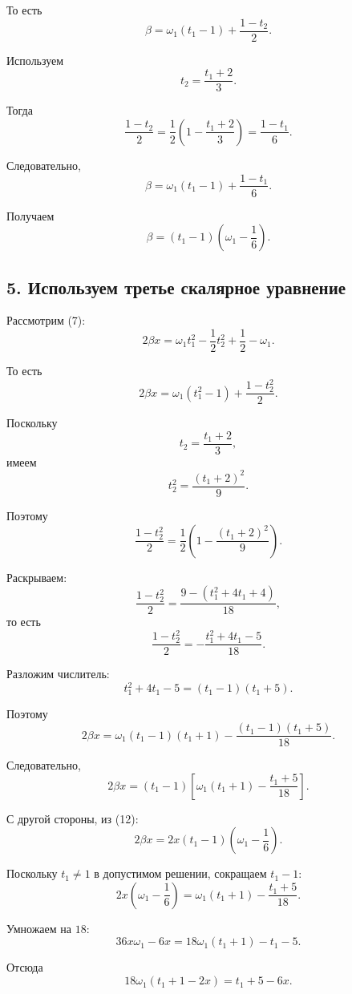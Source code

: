 \documentclass[12pt,a4paper]{article}
\begin{document}
		То есть
		\[
		\beta
		=
		\omega_1(t_1-1)+\frac{1-t_2}{2}.
		\tag{11}
		\]
		
		Используем
		\[
		t_2=\frac{t_1+2}{3}.
		\]
		
		Тогда
		\[
		\frac{1-t_2}{2}
		=
		\frac12
		\left(
		1-\frac{t_1+2}{3}
		\right)
		=
		\frac{1-t_1}{6}.
		\]
		
		Следовательно,
		\[
		\beta
		=
		\omega_1(t_1-1)+\frac{1-t_1}{6}.
		\]
		
		Получаем
		\[
		\boxed{
			\beta=(t_1-1)
			\left(
			\omega_1-\frac16
			\right)
		}.
		\tag{12}
		\]
		
		\subsection*{5. Используем третье скалярное уравнение}
		
		Рассмотрим (7):
		\[
		2\beta x
		=
		\omega_1t_1^2
		-\frac12t_2^2
		+\frac12-\omega_1.
		\]
		
		То есть
		\[
		2\beta x
		=
		\omega_1(t_1^2-1)
		+\frac{1-t_2^2}{2}.
		\tag{13}
		\]
		
		Поскольку
		\[
		t_2=\frac{t_1+2}{3},
		\]
		имеем
		\[
		t_2^2
		=
		\frac{(t_1+2)^2}{9}.
		\]
		
		Поэтому
		\[
		\frac{1-t_2^2}{2}
		=
		\frac12
		\left(
		1-\frac{(t_1+2)^2}{9}
		\right).
		\]
		
		Раскрываем:
		\[
		\frac{1-t_2^2}{2}
		=
		\frac{9-(t_1^2+4t_1+4)}{18},
		\]
		то есть
		\[
		\frac{1-t_2^2}{2}
		=
		-\frac{t_1^2+4t_1-5}{18}.
		\]
		
		Разложим числитель:
		\[
		t_1^2+4t_1-5=(t_1-1)(t_1+5).
		\]
		
		Поэтому
		\[
		2\beta x
		=
		\omega_1(t_1-1)(t_1+1)
		-
		\frac{(t_1-1)(t_1+5)}{18}.
		\]
		
		Следовательно,
		\[
		2\beta x
		=
		(t_1-1)
		\left[
		\omega_1(t_1+1)
		-\frac{t_1+5}{18}
		\right].
		\tag{14}
		\]
		
		С другой стороны, из (12):
		\[
		2\beta x
		=
		2x(t_1-1)
		\left(
		\omega_1-\frac16
		\right).
		\tag{15}
		\]
		
		Поскольку $t_1\neq1$ в допустимом решении, сокращаем $t_1-1$:
		\[
		2x
		\left(
		\omega_1-\frac16
		\right)
		=
		\omega_1(t_1+1)
		-\frac{t_1+5}{18}.
		\]
		
		Умножаем на $18$:
		\[
		36x\omega_1-6x
		=
		18\omega_1(t_1+1)-t_1-5.
		\]
		
		Отсюда
		\[
		18\omega_1(t_1+1-2x)
		=
		t_1+5-6x.
		\]
		
\end{document}

